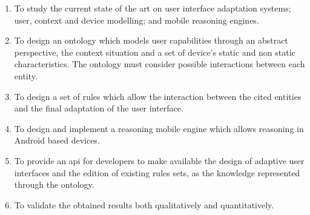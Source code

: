 \begin{enumerate}
  \item To study the current state of the art on user interface adaptation 
  systems; user, context and device modelling; and mobile reasoning engines.

  \item To design an ontology which models user capabilities through an abstract
  perspective, the context situation and a set of device's static and non static 
  characteristics. The ontology must consider possible interactions between each 
  entity.

  \item To design a set of rules which allow the interaction between the cited
  entities and the final adaptation of the user interface.

  \item To design and implement a reasoning mobile engine which allows reasoning
  in Android based devices.

  \item To provide an \ac{api} for developers to make available the design of 
  adaptive user interfaces and the edition of existing rules sets, as the 
  knowledge represented through the ontology.

  \item To validate the obtained results both qualitatively and quantitatively.
  
  
\end{enumerate}


% 
%   
%   


